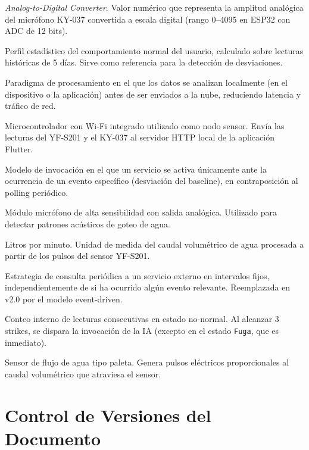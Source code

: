 \documentclass[12pt,a4paper]{article}
\begin{document}
\begin{description}[style=nextline, leftmargin=3cm, font=\bfseries]
    \item[ADC] \textit{Analog-to-Digital Converter}. Valor numérico que representa la amplitud analógica del micrófono KY-037 convertida a escala digital (rango 0--4095 en ESP32 con ADC de 12 bits).
    \item[Baseline] Perfil estadístico del comportamiento normal del usuario, calculado sobre lecturas históricas de 5 días. Sirve como referencia para la detección de desviaciones.
    \item[Edge Computing] Paradigma de procesamiento en el que los datos se analizan localmente (en el dispositivo o la aplicación) antes de ser enviados a la nube, reduciendo latencia y tráfico de red.
    \item[ESP32] Microcontrolador con Wi-Fi integrado utilizado como nodo sensor. Envía las lecturas del YF-S201 y el KY-037 al servidor HTTP local de la aplicación Flutter.
    \item[Event-Driven] Modelo de invocación en el que un servicio se activa únicamente ante la ocurrencia de un evento específico (desviación del baseline), en contraposición al polling periódico.
    \item[KY-037] Módulo micrófono de alta sensibilidad con salida analógica. Utilizado para detectar patrones acústicos de goteo de agua.
    \item[L/min] Litros por minuto. Unidad de medida del caudal volumétrico de agua procesada a partir de los pulsos del sensor YF-S201.
    \item[Polling] Estrategia de consulta periódica a un servicio externo en intervalos fijos, independientemente de si ha ocurrido algún evento relevante. Reemplazada en v2.0 por el modelo event-driven.
    \item[Strike] Conteo interno de lecturas consecutivas en estado no-normal. Al alcanzar 3 strikes, se dispara la invocación de la IA (excepto en el estado \texttt{Fuga}, que es inmediato).
    \item[YF-S201] Sensor de flujo de agua tipo paleta. Genera pulsos eléctricos proporcionales al caudal volumétrico que atraviesa el sensor.
\end{description}

\section{Control de Versiones del Documento}
\end{document}

